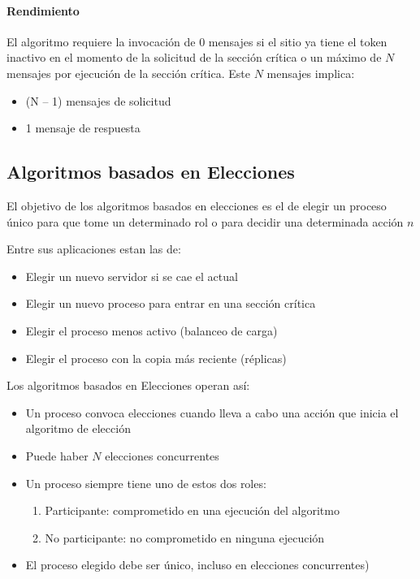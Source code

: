 { \paragraph{Rendimiento}
 
 
 
El algoritmo requiere  la invocación de $0$ mensajes si el sitio ya tiene el token inactivo en el momento de la solicitud de la sección crítica o un máximo de $N$ mensajes por ejecución de la sección crítica. Este $N$ mensajes implica:
\begin{itemize}
	\item (N – 1) mensajes de solicitud
	\item 1 mensaje de respuesta
\end{itemize}


\subsection{Algoritmos basados en Elecciones}
El objetivo de los algoritmos basados en elecciones es el de elegir un proceso único para que tome un determinado rol o para decidir una determinada acción $n $

Entre sus aplicaciones estan las de:
	\begin{itemize}
		\item Elegir un nuevo servidor si se cae el actual 
		\item Elegir un nuevo proceso para entrar en una sección crítica 
		\item Elegir el proceso menos activo (balanceo de carga) 
		\item Elegir el proceso con la copia más reciente (réplicas)
	\end{itemize}	
 

Los algoritmos basados en Elecciones operan as\'i:	
	\begin{itemize}
		\item Un proceso convoca elecciones cuando lleva a cabo una acción que inicia el algoritmo de elección 
		\item Puede haber $N$ elecciones concurrentes 
		\item Un proceso siempre tiene uno de estos dos roles: 
		\begin{enumerate}
			\item Participante: comprometido en una ejecución del algoritmo 
			\item No participante: no comprometido en ninguna ejecución
		\end{enumerate}			 
		\item El proceso elegido debe ser único, incluso en elecciones concurrentes)
	 

\end{itemize}}
